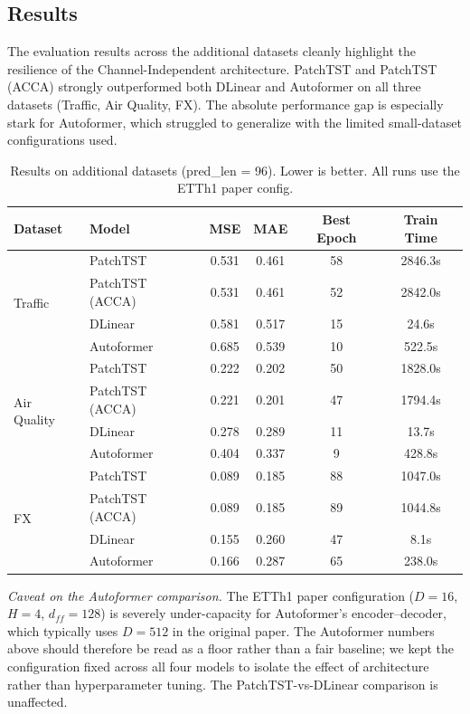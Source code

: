 \documentclass[11pt]{article}
\begin{document}
\subsection{Results}

The evaluation results across the additional datasets cleanly highlight the resilience of the Channel-Independent architecture. PatchTST and PatchTST (ACCA) strongly outperformed both DLinear and Autoformer on all three datasets (Traffic, Air Quality, FX). The absolute performance gap is especially stark for Autoformer, which struggled to generalize with the limited small-dataset configurations used.

\begin{table}[h]
\centering
\caption{Results on additional datasets (pred\_len = 96). Lower is better. All runs use the ETTh1 paper config.}
\label{tab:additional_results}
\begin{tabular}{llcccc}
\toprule
Dataset & Model & MSE & MAE & Best Epoch & Train Time \\
\midrule
\multirow{4}{*}{Traffic}
 & PatchTST        & 0.531 & 0.461 & 58 & 2846.3s \\
 & PatchTST (ACCA) & 0.531 & 0.461 & 52 & 2842.0s \\
 & DLinear         & 0.581 & 0.517 & 15 & 24.6s \\
 & Autoformer      & 0.685 & 0.539 & 10 & 522.5s \\
\midrule
\multirow{4}{*}{Air Quality}
 & PatchTST        & 0.222 & 0.202 & 50 & 1828.0s \\
 & PatchTST (ACCA) & 0.221 & 0.201 & 47 & 1794.4s \\
 & DLinear         & 0.278 & 0.289 & 11 & 13.7s \\
 & Autoformer      & 0.404 & 0.337 & 9 & 428.8s \\
\midrule
\multirow{4}{*}{FX}
 & PatchTST        & 0.089 & 0.185 & 88 & 1047.0s \\
 & PatchTST (ACCA) & 0.089 & 0.185 & 89 & 1044.8s \\
 & DLinear         & 0.155 & 0.260 & 47 & 8.1s \\
 & Autoformer      & 0.166 & 0.287 & 65 & 238.0s \\
\bottomrule
\end{tabular}
\end{table}

\emph{Caveat on the Autoformer comparison.} The ETTh1 paper configuration ($D{=}16$, $H{=}4$, $d_{ff}{=}128$) is severely under-capacity for Autoformer's encoder--decoder, which typically uses $D{=}512$ in the original paper. The Autoformer numbers above should therefore be read as a floor rather than a fair baseline; we kept the configuration fixed across all four models to isolate the effect of architecture rather than hyperparameter tuning. The PatchTST-vs-DLinear comparison is unaffected.
\end{document}
